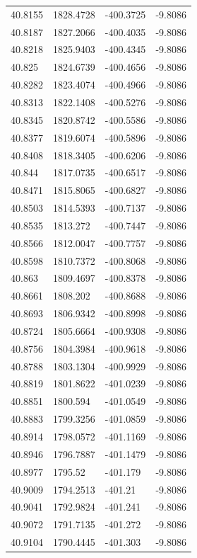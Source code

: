 \begin{table}[H]
\begin{tabular}{llll}
40.8155 & 1828.4728 & -400.3725 & -9.8086 \\
40.8187 & 1827.2066 & -400.4035 & -9.8086 \\
40.8218 & 1825.9403 & -400.4345 & -9.8086 \\
40.825 & 1824.6739 & -400.4656 & -9.8086 \\
40.8282 & 1823.4074 & -400.4966 & -9.8086 \\
40.8313 & 1822.1408 & -400.5276 & -9.8086 \\
40.8345 & 1820.8742 & -400.5586 & -9.8086 \\
40.8377 & 1819.6074 & -400.5896 & -9.8086 \\
40.8408 & 1818.3405 & -400.6206 & -9.8086 \\
40.844 & 1817.0735 & -400.6517 & -9.8086 \\
40.8471 & 1815.8065 & -400.6827 & -9.8086 \\
40.8503 & 1814.5393 & -400.7137 & -9.8086 \\
40.8535 & 1813.272 & -400.7447 & -9.8086 \\
40.8566 & 1812.0047 & -400.7757 & -9.8086 \\
40.8598 & 1810.7372 & -400.8068 & -9.8086 \\
40.863 & 1809.4697 & -400.8378 & -9.8086 \\
40.8661 & 1808.202 & -400.8688 & -9.8086 \\
40.8693 & 1806.9342 & -400.8998 & -9.8086 \\
40.8724 & 1805.6664 & -400.9308 & -9.8086 \\
40.8756 & 1804.3984 & -400.9618 & -9.8086 \\
40.8788 & 1803.1304 & -400.9929 & -9.8086 \\
40.8819 & 1801.8622 & -401.0239 & -9.8086 \\
40.8851 & 1800.594 & -401.0549 & -9.8086 \\
40.8883 & 1799.3256 & -401.0859 & -9.8086 \\
40.8914 & 1798.0572 & -401.1169 & -9.8086 \\
40.8946 & 1796.7887 & -401.1479 & -9.8086 \\
40.8977 & 1795.52 & -401.179 & -9.8086 \\
40.9009 & 1794.2513 & -401.21 & -9.8086 \\
40.9041 & 1792.9824 & -401.241 & -9.8086 \\
40.9072 & 1791.7135 & -401.272 & -9.8086 \\
40.9104 & 1790.4445 & -401.303 & -9.8086 \\

\end{tabular}
\end{table}
